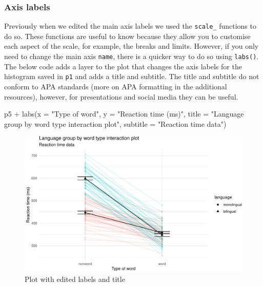 \documentclass[
  english,
  doc,floatsintext]{apa6}
\newenvironment{Shaded}{\begin{snugshade}}{\end{snugshade}}
\newcommand{\AttributeTok}[1]{\textcolor[rgb]{0.77,0.63,0.00}{#1}}
\newcommand{\FunctionTok}[1]{\textcolor[rgb]{0.00,0.00,0.00}{#1}}
\newcommand{\NormalTok}[1]{#1}
\newcommand{\SpecialCharTok}[1]{\textcolor[rgb]{0.00,0.00,0.00}{#1}}
\newcommand{\StringTok}[1]{\textcolor[rgb]{0.31,0.60,0.02}{#1}}
\begin{document}
\hypertarget{axis-labels}{%
\subsubsection{Axis labels}\label{axis-labels}}

Previously when we edited the main axis labels we used the \texttt{scale\_} functions to do so. These functions are useful to know because they allow you to customise each aspect of the scale, for example, the breaks and limits. However, if you only need to change the main axis \texttt{name}, there is a quicker way to do so using \texttt{labs()}. The below code adds a layer to the plot that changes the axis labels for the histogram saved in \texttt{p1} and adds a title and subtitle. The title and subtitle do not conform to APA standards (more on APA formatting in the additional resources), however, for presentations and social media they can be useful.

\begin{Shaded}
\begin{Highlighting}[]
\NormalTok{p5 }\SpecialCharTok{+} \FunctionTok{labs}\NormalTok{(}\AttributeTok{x =} \StringTok{"Type of word"}\NormalTok{,}
          \AttributeTok{y =} \StringTok{"Reaction time (ms)"}\NormalTok{,}
          \AttributeTok{title =} \StringTok{"Language group by word type interaction plot"}\NormalTok{,}
          \AttributeTok{subtitle =} \StringTok{"Reaction time data"}\NormalTok{)}
\end{Highlighting}
\end{Shaded}

\begin{figure}

{\centering \includegraphics[width=1\linewidth]{images/edited-labels-1} 

}

\caption{Plot with edited labels and title}\label{fig:edited-labels}
\end{figure}
\end{document}

